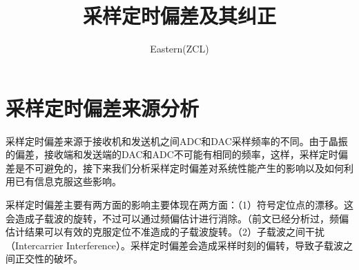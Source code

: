 \documentclass[10pt,a4paper,UTF8]{article}
\author{Eastern(ZCL)}
\date{}
\title{采样定时偏差及其纠正}
\begin{document}
\maketitle
\tableofcontents
{}

\section{采样定时偏差来源分析}
\label{sec:orgd9e05b8}

采样定时偏差来源于接收机和发送机之间ADC和DAC采样频率的不同。由于晶振的偏差，接收端和发送端的DAC和ADC不可能有相同的频率，这样，采样定时偏差是不可避免的，接下来我们分析采样定时偏差对系统性能产生的影响以及如何利用已有信息克服这些影响。

采样定时偏差主要有两方面的影响主要体现在两方面：（1）符号定位点的漂移。这会造成子载波的旋转，不过可以通过频偏估计进行消除。（前文已经分析过，频偏估计结果可以有效的克服定位不准造成的子载波旋转。（2）子载波之间干扰（Intercarrier Interference）。采样定时偏差会造成采样时刻的偏转，导致子载波之间正交性的破坏。
\end{document}
